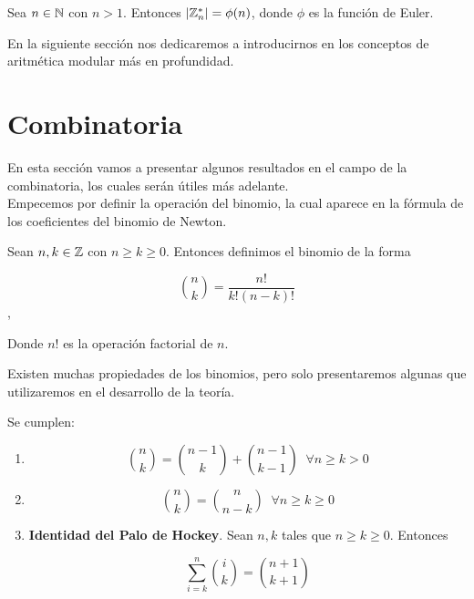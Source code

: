 \begin{proposicion}
	Sea $n \in \mathbb{N}$ con $n > 1$. Entonces $|\mathbb{Z}_n^*| = \phi(n)$, donde $\phi$ es la función de Euler.
\end{proposicion}

En la siguiente sección nos dedicaremos a introducirnos en los conceptos de aritmética modular más en profundidad.

\section{Combinatoria}

En esta sección vamos a presentar algunos resultados en el campo de la combinatoria, los cuales serán útiles más adelante.\\

Empecemos por definir la operación del binomio, la cual aparece en la fórmula de los coeficientes del binomio de Newton.

\begin{definicion}
	Sean $n, k \in \mathbb{Z}$ con $n \geq k \geq 0$. Entonces definimos el binomio de la forma
	
	\[ \binom{n}{k} = \frac{n!}{k!(n - k)!} \],
	
	Donde $n!$ es la operación factorial de $n$.
\end{definicion}

Existen muchas propiedades de los binomios, pero solo presentaremos algunas que utilizaremos en el desarrollo de la teoría.

\begin{proposicion}
	Se cumplen:
	
	\begin{enumerate}
		\item \[ \binom{n}{k} = \binom{n-1}{k} + \binom{n-1}{k-1}\;\;\forall n \geq k > 0 \]
		
		\item \[ \binom{n}{k} = \binom{n}{n-k}\;\;\forall n \geq k \geq 0 \]
		
		\item \textbf{Identidad del Palo de Hockey}. Sean $n, k$ tales que $n \geq k \geq 0$. Entonces
		
		\begin{equation}\label{identidad_del_palo_de_hockey}
		\sum_{i=k}^{n}\binom{i}{k} = \binom{n+1}{k+1}
		\end{equation}
	\end{enumerate}
\end{proposicion}

